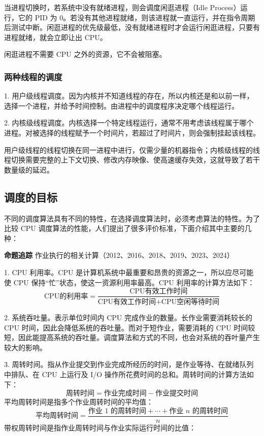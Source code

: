 \documentclass{ctexbook}
\begin{document}
	当进程切换时，若系统中没有就绪进程，则会调度闲逛进程（Idle Process）运行，它的 PID 为 0。若没有其他进程就绪，则该进程就一直运行，并在指令周期后测试中断。闲逛进程的优先级最低，没有就绪进程时才会运行闲逛进程，只要有进程就绪，就会立即让出 CPU。
	
	闲逛进程不需要 CPU 之外的资源，它不会被阻塞。
	
	\subsubsection{两种线程的调度}
	
	1. 用户级线程调度。因为内核并不知道线程的存在，所以内核还是和以前一样，选择一个进程，并给予时间控制。由进程中的调度程序决定哪个线程运行。
	
	2. 内核级线程调度。内核选择一个特定线程运行，通常不用考虑该线程属于哪个进程。对被选择的线程赋予一个时间片，若超过了时间片，则会强制挂起该线程。
	
	用户级线程的线程切换在同一进程中进行，仅需少量的机器指令；内核级线程的线程切换需要完整的上下文切换、修改内存映像、使高速缓存失效，这就导致了若干数量级的延迟。
	
	\subsection{调度的目标}
	
	不同的调度算法具有不同的特性，在选择调度算法时，必须考虑算法的特性。为了比较 CPU 调度算法的性能，人们提出了很多评价标准，下面介绍其中主要的几种：
	
	\textbf{命题追踪} 作业执行的相关计算（2012、2016、2018、2019、2023、2024）
	
	1. CPU 利用率。CPU 是计算机系统中最重要和昂贵的资源之一，所以应尽可能使 CPU 保持“忙”状态，使这一资源利用率最高。CPU 利用率的计算方法如下：
	\[
	\text{CPU的利用率} = \frac{\text{CPU有效工作时间}}{\text{CPU有效工作时间} + \text{CPU空闲等待时间}}
	\]
	
	2. 系统吞吐量。表示单位时间内 CPU 完成作业的数量。长作业需要消耗较长的 CPU 时间，因此会降低系统的吞吐量。而对于短作业，需要消耗的 CPU 时间较短，因此能提高系统的吞吐量。调度算法和方式的不同，也会对系统的吞叶量产生较大的影响。
	
	3. 周转时间。指从作业提交到作业完成所经历的时间，是作业等待、在就绪队列中排队、在 CPU 上运行及 I/O 操作所花费时间的总和。周转时间的计算方法如下：
	\[
	\text{周转时间} = \text{作业完成时间} - \text{作业提交时间}
	\]
	平均周转时间是指多个作业周转时间的平均值：
	\[
	\text{平均周转时间} = \frac{\text{作业 1 的周转时间} + \cdots + \text{作业 } n \text{ 的周转时间}}{n}
	\]
	带权周转时间是指作业周转时间与作业实际运行时间的比值：
	
\end{document}
